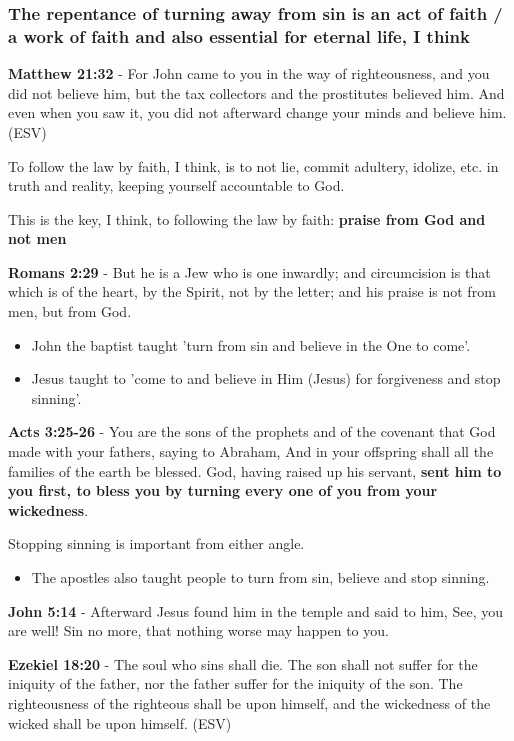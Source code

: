 \documentclass[11pt]{article}
\begin{document}
\subsubsection{The repentance of turning away from sin is an act of faith / a work of faith and also essential for eternal life, I think}
\label{sec:org12b6f3d}
\textbf{Matthew 21:32} - For John came to you in the way of righteousness, and you did not believe him, but the tax collectors and the prostitutes believed him. And even when you saw it, you did not afterward change your minds and believe him. (ESV)

To follow the law by faith, I think, is to not lie, commit adultery, idolize, etc. in truth and reality, keeping yourself accountable to God.

This is the key, I think, to following the law by faith: \textbf{praise from God and not men}

\textbf{Romans 2:29} - But he is a Jew who is one inwardly; and circumcision is that which is of the heart, by the Spirit, not by the letter; and his praise is not from men, but from God.

\begin{itemize}
\item John the baptist taught 'turn from sin and believe in the One to come'.
\item Jesus taught to 'come to and believe in Him (Jesus) for forgiveness and stop sinning'.
\end{itemize}

\textbf{Acts 3:25-26} - You are the sons of the prophets and of the covenant that God made with your fathers, saying to Abraham, And in your offspring shall all the families of the earth be blessed. God, having raised up his servant, \textbf{sent him to you first, to bless you by turning every one of you from your wickedness}.

Stopping sinning is important from either angle.

\begin{itemize}
\item The apostles also taught people to turn from sin, believe and stop sinning.
\end{itemize}

\textbf{John 5:14} - Afterward Jesus found him in the temple and said to him, See, you are well! Sin no more, that nothing worse may happen to you.

\textbf{Ezekiel 18:20} - The soul who sins shall die.  The son shall not suffer for the iniquity of the father, nor the father suffer for the iniquity of the son.  The righteousness of the righteous shall be upon himself, and the wickedness of the wicked shall be upon himself.  (ESV)
\end{document}
